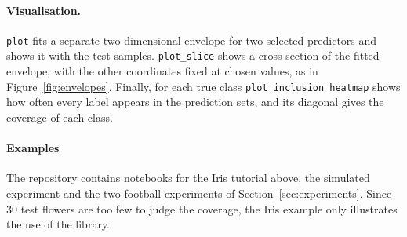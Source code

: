\paragraph{Visualisation.} \texttt{plot} fits a separate two dimensional envelope for two selected predictors and shows it 
with the test samples. \texttt{plot\_slice} shows a cross section of the fitted envelope, with the other coordinates fixed at 
chosen values, as in Figure~\ref{fig:envelopes}. Finally, for each true class \texttt{plot\_inclusion\_heatmap} shows 
how often every label appears in the prediction sets, and its diagonal gives the coverage of each class.

\paragraph{Examples} The repository contains notebooks for the Iris tutorial above, the simulated experiment 
and the two football experiments of Section~\ref{sec:experiments}. Since $30$ test flowers are too few to judge the 
coverage, the Iris example only illustrates the use of the library. 